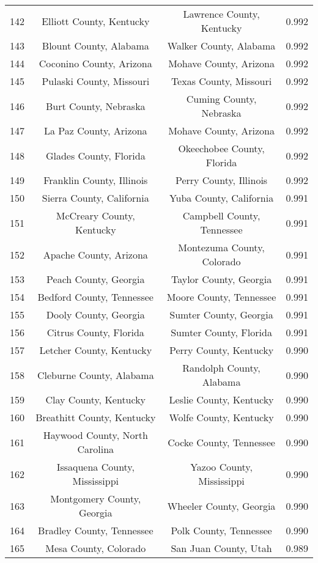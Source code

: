 \begin{longtable}{cccc}
  142 & Elliott County, Kentucky & Lawrence County, Kentucky & 0.992 \\ 
  143 & Blount County, Alabama & Walker County, Alabama & 0.992 \\ 
  144 & Coconino County, Arizona & Mohave County, Arizona & 0.992 \\ 
  145 & Pulaski County, Missouri & Texas County, Missouri & 0.992 \\ 
  146 & Burt County, Nebraska & Cuming County, Nebraska & 0.992 \\ 
  147 & La Paz County, Arizona & Mohave County, Arizona & 0.992 \\ 
  148 & Glades County, Florida & Okeechobee County, Florida & 0.992 \\ 
  149 & Franklin County, Illinois & Perry County, Illinois & 0.992 \\ 
  150 & Sierra County, California & Yuba County, California & 0.991 \\ 
  151 & McCreary County, Kentucky & Campbell County, Tennessee & 0.991 \\ 
  152 & Apache County, Arizona & Montezuma County, Colorado & 0.991 \\ 
  153 & Peach County, Georgia & Taylor County, Georgia & 0.991 \\ 
  154 & Bedford County, Tennessee & Moore County, Tennessee & 0.991 \\ 
  155 & Dooly County, Georgia & Sumter County, Georgia & 0.991 \\ 
  156 & Citrus County, Florida & Sumter County, Florida & 0.991 \\ 
  157 & Letcher County, Kentucky & Perry County, Kentucky & 0.990 \\ 
  158 & Cleburne County, Alabama & Randolph County, Alabama & 0.990 \\ 
  159 & Clay County, Kentucky & Leslie County, Kentucky & 0.990 \\ 
  160 & Breathitt County, Kentucky & Wolfe County, Kentucky & 0.990 \\ 
  161 & Haywood County, North Carolina & Cocke County, Tennessee & 0.990 \\ 
  162 & Issaquena County, Mississippi & Yazoo County, Mississippi & 0.990 \\ 
  163 & Montgomery County, Georgia & Wheeler County, Georgia & 0.990 \\ 
  164 & Bradley County, Tennessee & Polk County, Tennessee & 0.990 \\ 
  165 & Mesa County, Colorado & San Juan County, Utah & 0.989 \\ 

\end{longtable}
